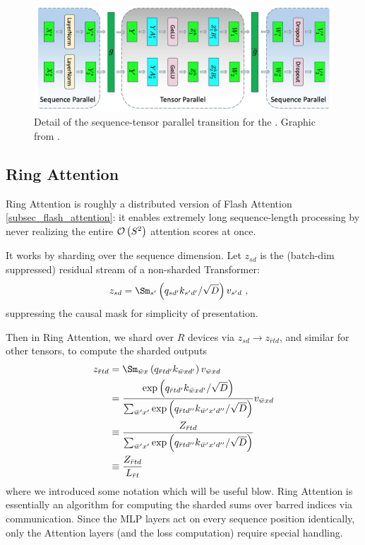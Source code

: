 \begin{figure}[ht]
	\centering
	\includegraphics[scale=.25]{figures/mlp-tensor-sequence-parallel.jpg}
	\caption{Detail of the sequence-tensor parallel transition for the  . Graphic from
		\cite{shoeybi2020megatronlm}. }
	\label{fig_tensor_seq_parallel_detail}
\end{figure}


\subsection{Ring Attention \label{subsec_ring_attention}}

Ring Attention \cite{liu2023ringattentionblockwisetransformers} is roughly a distributed version of
Flash Attention \ref{subsec_flash_attention}: it enables extremely long sequence-length processing
by never realizing the entire $ \mathcal{O} \left( S ^{ 2 } \right)  $ attention scores at once.

It works by sharding over the sequence dimension. Let $ z _{ sd } $ is the (batch-dim suppressed)
residual stream of a non-sharded Transformer:
\begin{align}
    z _{  sd } &= \Sm _{ s' } \left ( q _{ sd' } k _{ s'd' } /\sqrt{D}\right ) v _{ s'd } \ ,
\end{align}
suppressing the causal mask for simplicity of presentation.

Then in Ring Attention, we shard over $ R $ devices via $ z _{ sd } \longrightarrow z _{ \bar{r}td }
$, and similar for other tensors, to compute the sharded outputs
\begin{align}
    z _{  \bar{r}td } &= \Sm _{ \bar{w} x  } \left ( q _{ \bar{r}t d' } k _{ \bar{w}x d' } \right ) v _{ \bar{w}x d }\nn
     &= \frac{ \exp \left ( q _{ \bar{r}t d' } k _{ \bar{w}x d' }/\sqrt{D} \right ) }{ \sum _{ \bar{w}'x' } \exp \left (q _{ \bar{r}t d'' } k _{ \bar{w}'x' d'' }/\sqrt{D}\right )  } v _{ \bar{w}xd }\nn
     &\equiv \frac{ Z _{\bar{r}td } }{   \sum _{ \bar{w}'x' } \exp  \left (q _{ \bar{r}t d'' } k _{ \bar{w}'x' d'' }/\sqrt{D} \right ) }\nn
     &\equiv \frac{ Z _{\bar{r}td } }{L _{ \bar{r}t }}
\end{align}
where we introduced some notation which will be useful blow. Ring Attention is essentially an
algorithm for computing the sharded sums over barred indices via communication. Since the MLP layers
act on every sequence position identically, only the Attention layers (and the loss computation)
require special handling.

